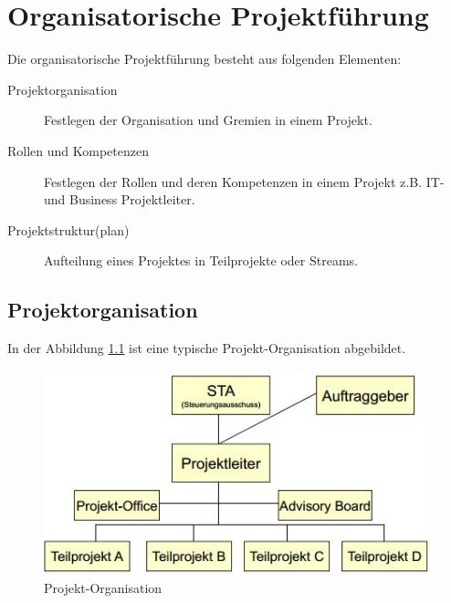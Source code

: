 \chapter{Organisatorische Projektführung}

Die organisatorische Projektführung besteht aus folgenden Elementen:
\begin{description}
	\item[Projektorganisation] Festlegen der Organisation und Gremien in einem Projekt.
	\item[Rollen und Kompetenzen] Festlegen der Rollen und deren Kompetenzen in einem Projekt z.B. IT- und Business Projektleiter.
	\item[Projektstruktur(plan)] Aufteilung eines Projektes in Teilprojekte oder Streams.
\end{description}

\section{Projektorganisation}
In der Abbildung \ref{fig:projekt-organisation} ist eine typische Projekt-Organisation abgebildet.

\begin{figure}[h!]
\centering
\includegraphics[width=0.7\linewidth]{fig/projekt-organisation}
\caption{Projekt-Organisation}
\label{fig:projekt-organisation}
\end{figure}

